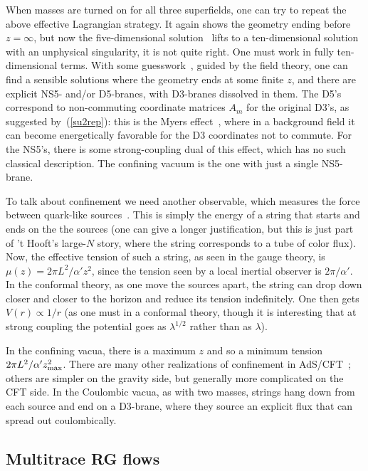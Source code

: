 \documentclass[12pt]{article}
\begin{document}
{When masses are turned on for all three superfields, one can try to repeat the above effective Lagrangian strategy.  It again shows the geometry ending before $z = \infty$, but now the five-dimensional solution~\cite{Girardello:1999bd} lifts to a ten-dimensional solution with an unphysical singularity, it is not quite right.  One must work in fully ten-dimensional terms.  With some guesswork~\cite{Polchinski:2000uf}, guided by the field theory, one can find a sensible solutions where the geometry ends at some finite $z$, and there are explicit NS5- and/or D5-branes, with D3-branes dissolved in them.  The D5's correspond to non-commuting coordinate matrices $A_m$ for the original D3's, as suggested by~(\ref{su2rep}): this is the Myers effect~\cite{Myers:1999ps}, where in a background field it can become energetically favorable for the D3 coordinates not to commute.  For the NS5's, there is some strong-coupling dual of this effect, which has no such classical description.  The confining vacuum is the one with just a single NS5-brane.

To talk about confinement we need another observable, which measures the force between quark-like sources~\cite{Rey:1998ik}.  This is simply the energy of a string that starts and ends on the the sources (one can give a longer justification, but this is just part of 't Hooft's large-$N$ story, where the string corresponds to a tube of color flux).  Now, the effective tension of such a string, as seen in the gauge theory, is $\mu(z) = 2\pi L^2/\alpha' z^2$, since the tension seen by a local inertial observer is $2\pi/\alpha'$.  In the conformal theory, as one move the sources apart, the string can drop down closer and closer to the horizon and reduce its tension indefinitely.  One then gets $V(r) \propto 1/r$ (as one must in a conformal theory, though it is interesting that at strong coupling the potential goes as $\lambda^{1/2}$ rather than as $\lambda$).

In the confining vacua, there is a maximum $z$ and so a minimum tension $2\pi L^2/\alpha' z_{\rm max}^2$.  There are many other realizations of confinement in AdS/CFT~\cite{W,Klebanov:2000hb, Maldacena:2000yy}; others are simpler on the gravity side, but generally more complicated on the CFT side.  In the Coulombic vacua, as with two masses, strings hang down from each source and end on a D3-brane, where they source an explicit flux that can spread out coulombically.

\subsection{Multitrace RG flows}

}
\end{document}
